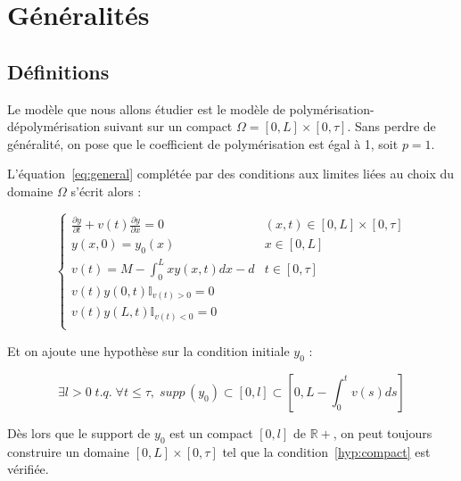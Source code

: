 \documentclass[a4paper]{article}
\newcommand{\pol}{p}
\newcommand{\dep}{d}
\begin{document}
\section{Généralités}

\subsection{Définitions}

Le modèle que nous allons étudier est le modèle de polymérisation-dépolymérisation suivant 
sur un compact $\Omega = [0,L] \times [0,\tau]$. 
Sans perdre de généralité, 
on pose que le coefficient de polymérisation est égal à 1, 
soit $\pol =1$.

L'équation~\eqref{eq:general} complétée par des conditions aux limites liées au choix du domaine $\Omega$ s'écrit alors :

\begin{equation}
		\label{eq:poldep}
		\begin{cases}
			\displaystyle \frac{\partial y}{\partial t}+ v(t) \frac{\partial y} {\partial x}  = 0 & (x,t) \in [0,L] \times [0, \tau] \\
             y(x,0) = y_{0} (x) & x\in[0,L]\\
			 v(t) = M - \int_0^L x y(x,t)dx - \dep & t \in [0,\tau]\\
			 v(t)y(0,t)\mathbb{I}_{v(t) > 0} = 0 \\
			 v(t)y(L,t)\mathbb{I}_{v(t) < 0} = 0 \\
		\end{cases}
\end{equation}

Et on ajoute une hypothèse sur la condition initiale $y_0$ :

\begin{equation}
	\label{hyp:compact}
	\exists l>0 \; t.q. \; \forall t \leq \tau, \; supp \, (y_0) \subset [0,l]\subset [0,L-\int_{0}^t v(s)ds]
\end{equation}

\begin{lemme}
	Dès lors que le support de $y_0$ est un compact $[0,l]$ de $\mathbb{R+}$,
	on peut toujours construire un domaine $[0,L]\times [0,\tau]$
	tel que la condition~\eqref{hyp:compact} est vérifiée.
\end{lemme}
\end{document}
